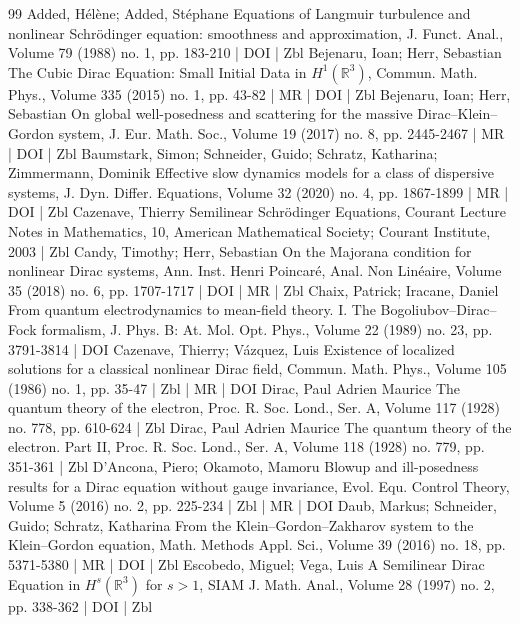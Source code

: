 \begin{thebibliography}{99}
Added, Hélène; Added, Stéphane Equations of Langmuir turbulence and nonlinear Schrödinger equation: smoothness and approximation, J. Funct. Anal., Volume 79 (1988) no. 1, pp. 183-210 | DOI | Zbl
Bejenaru, Ioan; Herr, Sebastian The Cubic Dirac Equation: Small Initial Data in ${H}^1(\mathbb{R}^3)$, Commun. Math. Phys., Volume 335 (2015) no. 1, pp. 43-82 | MR | DOI | Zbl
Bejenaru, Ioan; Herr, Sebastian On global well-posedness and scattering for the massive Dirac–Klein–Gordon system, J. Eur. Math. Soc., Volume 19 (2017) no. 8, pp. 2445-2467 | MR | DOI | Zbl
Baumstark, Simon; Schneider, Guido; Schratz, Katharina; Zimmermann, Dominik Effective slow dynamics models for a class of dispersive systems, J. Dyn. Differ. Equations, Volume 32 (2020) no. 4, pp. 1867-1899 | MR | DOI | Zbl
Cazenave, Thierry Semilinear Schrödinger Equations, Courant Lecture Notes in Mathematics, 10, American Mathematical Society; Courant Institute, 2003 | Zbl
Candy, Timothy; Herr, Sebastian On the Majorana condition for nonlinear Dirac systems, Ann. Inst. Henri Poincaré, Anal. Non Linéaire, Volume 35 (2018) no. 6, pp. 1707-1717 | DOI | MR | Zbl
Chaix, Patrick; Iracane, Daniel From quantum electrodynamics to mean-field theory. I. The Bogoliubov–Dirac–Fock formalism, J. Phys. B: At. Mol. Opt. Phys., Volume 22 (1989) no. 23, pp. 3791-3814 | DOI
Cazenave, Thierry; Vázquez, Luis Existence of localized solutions for a classical nonlinear Dirac field, Commun. Math. Phys., Volume 105 (1986) no. 1, pp. 35-47 | Zbl | MR | DOI
Dirac, Paul Adrien Maurice The quantum theory of the electron, Proc. R. Soc. Lond., Ser. A, Volume 117 (1928) no. 778, pp. 610-624 | Zbl
Dirac, Paul Adrien Maurice The quantum theory of the electron. Part II, Proc. R. Soc. Lond., Ser. A, Volume 118 (1928) no. 779, pp. 351-361 | Zbl
D’Ancona, Piero; Okamoto, Mamoru Blowup and ill-posedness results for a Dirac equation without gauge invariance, Evol. Equ. Control Theory, Volume 5 (2016) no. 2, pp. 225-234 | Zbl | MR | DOI
Daub, Markus; Schneider, Guido; Schratz, Katharina From the Klein–Gordon–Zakharov system to the Klein–Gordon equation, Math. Methods Appl. Sci., Volume 39 (2016) no. 18, pp. 5371-5380 | MR | DOI | Zbl
Escobedo, Miguel; Vega, Luis A Semilinear Dirac Equation in ${H}^s(\mathbb{R}^3)$ for $s> 1$, SIAM J. Math. Anal., Volume 28 (1997) no. 2, pp. 338-362 | DOI | Zbl

\end{thebibliography}
